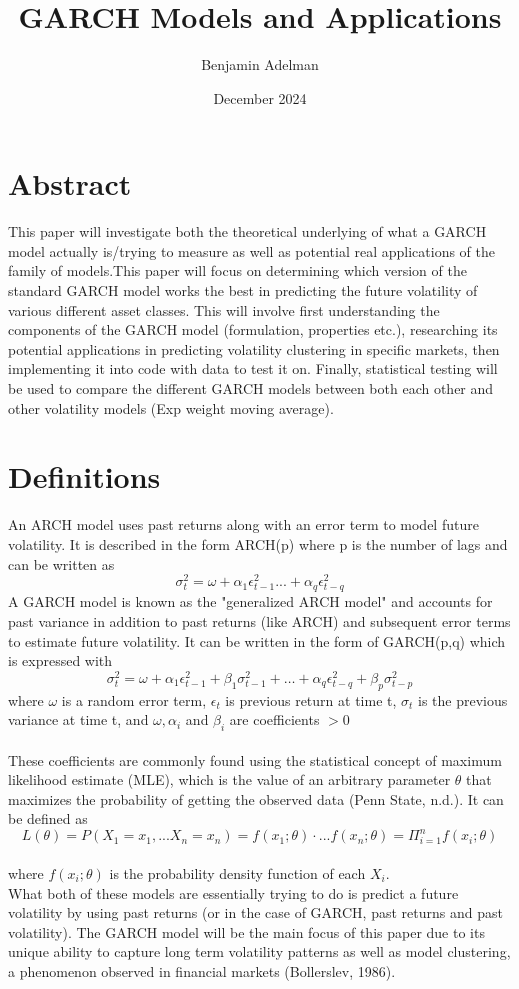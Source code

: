 \documentclass{article}
\title{GARCH Models and Applications}
\author{Benjamin Adelman}
\date{December 2024}
\begin{document}
\maketitle

\section{Abstract}
This paper will investigate both the theoretical underlying of what a GARCH model actually is/trying to measure as well as potential real applications of the family of models.This paper will focus on determining which version of the standard GARCH model works the best in predicting the future volatility of various different asset classes. This will involve first understanding the components of the GARCH model (formulation, properties etc.), researching its potential applications in predicting volatility clustering in specific markets, then implementing it into code with data to test it on. Finally, statistical testing will be used to compare the different GARCH models between both each other and other volatility models (Exp weight moving average).
\section{Definitions}
An ARCH model uses past returns along with an error term to model future volatility. It is described in the form ARCH(p) where p is the number of lags and can be written as $$\sigma^2_t = \omega + \alpha_1\epsilon^2_{t-1} ... + \alpha_q \epsilon^2_{t-q}$$
A GARCH model is known as the "generalized ARCH model" and accounts for past variance in addition to past returns (like ARCH) and subsequent error terms to estimate future volatility. It can be written in the form  of GARCH(p,q) which is expressed with $$\sigma^2_t = \omega + \alpha_1 \epsilon^2_{t-1} +\beta_1 \sigma^2_{t-1} + … + \alpha_q \epsilon_{t-q}^2 + \beta_p \sigma^2_{t-p}$$
where $\omega$ is a random error term, $\epsilon_t$ is previous return at time t, $\sigma_t$ is the previous variance at time t, and $\omega, \alpha_i$ and $\beta_i$ are coefficients $>0$ \\
\\
 These coefficients are commonly found using the statistical concept of maximum likelihood estimate (MLE), which is the value of an arbitrary parameter $\theta$ that maximizes the probability of getting the observed data (Penn State, n.d.). It can be defined as $$L(\theta) = P(X_1=x_1,...X_n=x_n) = f(x_1;\theta) \cdot...f(x_n;\theta) = \Pi_{i=1}^nf(x_i;\theta)$$
 \\
 where $f(x_i; \theta)$ is the probability density function of each $X_i$.
 \\
 What both of these models are essentially trying to do is predict a future volatility by using past returns (or in the case of GARCH, past returns and past volatility). The GARCH model will be the main focus of this paper due to its unique ability to capture long term volatility patterns as well as model clustering, a phenomenon observed in financial markets (Bollerslev, 1986).\\
\end{document}
